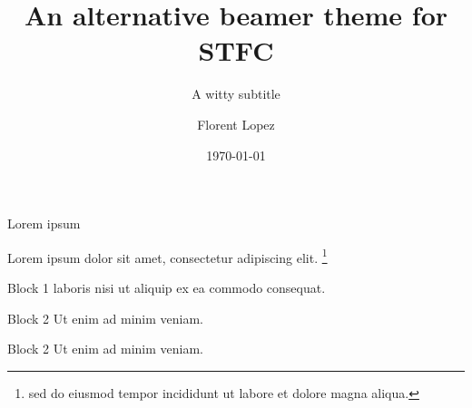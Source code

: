\documentclass{beamer}
\title{An alternative beamer theme for STFC}
\subtitle{A witty subtitle}
\date{\today}
\author{Florent Lopez}
\institute{Institute or miscellaneous information}
\begin{document}
\maketitle

\begin{frame}{Lorem ipsum}

  Lorem ipsum dolor sit amet, consectetur adipiscing elit. \footnote{sed do
  eiusmod tempor incididunt ut labore et dolore magna aliqua.}
  
  \begin{block}{Block 1}
    laboris nisi ut aliquip ex ea commodo consequat.
  \end{block}

  \begin{alertblock}{Block 2}
    Ut enim ad minim veniam.
  \end{alertblock}

  \begin{exampleblock}{Block 2}
    Ut enim ad minim veniam.
  \end{exampleblock}

\end{frame}
\end{document}
